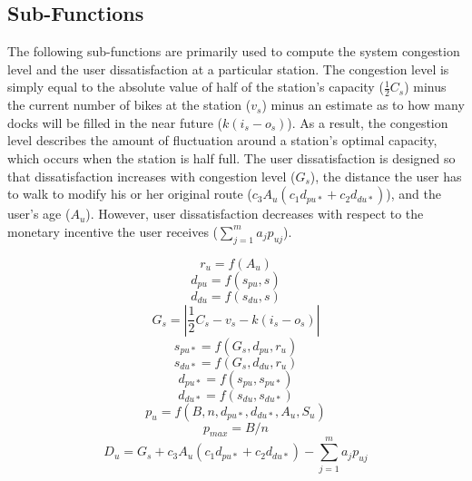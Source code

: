 \documentclass[times, 10pt,twocolumn]{article}
\begin{document}
\subsection{Sub-Functions}

The following sub-functions are primarily used to compute the system congestion level and the user dissatisfaction at a particular station. The congestion level is simply equal to the absolute value of half of the station's capacity ($\frac{1}{2}C_s$) minus the current number of bikes at the station ($v_s$) minus an estimate as to how many docks will be filled in the near future ($k(i_s - o_s)$). As a result, the congestion level describes the amount of fluctuation around a station's optimal capacity, which occurs when the station is half full. The user dissatisfaction is designed so that dissatisfaction increases with congestion level ($G_s$), the distance the user has to walk to modify his or her original route ($c_3A_u(c_1d_{pu*} + c_2d_{du*})$), and the user's age ($A_u$). However, user dissatisfaction decreases with respect to the monetary incentive the user receives ($\sum_{j=1}^{m}a_jp_{uj}$).

\begin{equation}
r_u = f(A_u)
\end{equation}
\begin{equation}
d_{pu} = f(s_{pu}, s)
\end{equation}
\begin{equation}
d_{du} = f(s_{du}, s)
\end{equation}
\begin{equation}
G_s = |\frac{1}{2}C_s - v_s - k(i_s - o_s)|
\end{equation}
\begin{equation}
s_{pu*} = f(G_s, d_{pu}, r_u)
\end{equation}
\begin{equation}
s_{du*} = f(G_s, d_{du}, r_u)
\end{equation}
\begin{equation}
d_{pu*} = f(s_{pu}, s_{pu*})
\end{equation}
\begin{equation}
d_{du*} = f(s_{du}, s_{du*})
\end{equation}
\begin{equation}
p_u = f(B, n, d_{pu*}, d_{du*}, A_u, S_u)
\end{equation}
\begin{equation}
p_{max} = B/n
\end{equation}
\begin{equation}
D_u = G_s + c_3A_u(c_1d_{pu*} + c_2d_{du*}) - \sum_{j=1}^{m}a_jp_{uj}
\end{equation}
\end{document}
